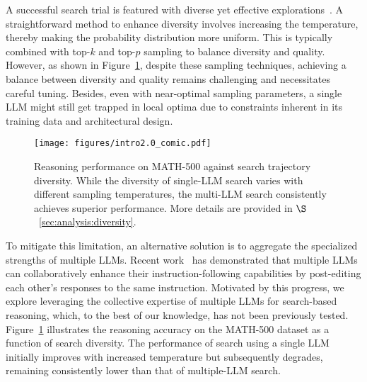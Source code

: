 
A successful search trial is featured with diverse yet effective explorations~\cite{hao-etal-2023-reasoning,yao2024tree}.
A straightforward method to enhance diversity involves increasing the temperature, thereby making the probability distribution more uniform.
This is typically combined with top-$k$ and top-$p$ sampling to balance diversity and quality.
However, as shown in Figure~\ref{fig:intro}, despite these sampling techniques, achieving a balance between diversity and quality remains challenging and necessitates careful tuning.
Besides, even with near-optimal sampling parameters, a single LLM might still get trapped in local optima due to constraints inherent in its training data and architectural design. 

\begin{figure}
    \centering
    \texttt{[image: figures/intro2.0\_comic.pdf]}
    \caption{
    Reasoning performance on MATH-500 against search trajectory diversity. 
    While the diversity of single-LLM search varies with different sampling temperatures, the multi-LLM search consistently achieves superior performance. 
    More details are provided in $\S$~\ref{sec:analysis:diversity}.
    }
    \label{fig:intro}
    \vskip -0.2in
\end{figure}


To mitigate this limitation, an alternative solution is to aggregate the specialized strengths of multiple LLMs.
Recent work~\cite{moa} has demonstrated that multiple LLMs can collaboratively enhance their instruction-following capabilities by post-editing each other's responses to the same instruction. 
Motivated by this progress, we explore leveraging the collective expertise of multiple LLMs for search-based reasoning, which, to the best of our knowledge, has not been previously tested.
Figure~\ref{fig:intro} illustrates the reasoning accuracy on the MATH-500 dataset as a function of search diversity.
The performance of search using a single LLM initially improves with increased temperature but subsequently degrades, remaining consistently lower than that of multiple-LLM search.

